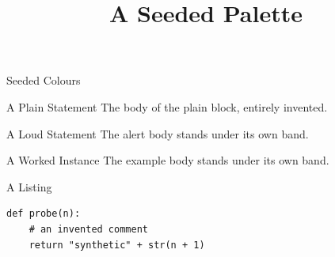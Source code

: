 \documentclass{slides}
\title{A Seeded Palette}
\begin{document}
\begin{frame}{Seeded \alert{Colours}}
\begin{block}{A Plain Statement}
The body of the plain block, entirely invented.
\end{block}
\begin{alertblock}{A Loud Statement}
The alert body stands under its own band.
\end{alertblock}
\begin{exampleblock}{A Worked Instance}
The example body stands under its own band.
\end{exampleblock}
\end{frame}

\begin{frame}[fragile]{A Listing}
\begin{verbatim}
def probe(n):
    # an invented comment
    return "synthetic" + str(n + 1)
\end{verbatim}
\end{frame}
\end{document}
